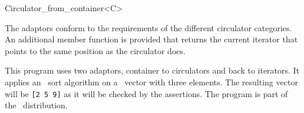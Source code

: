 \begin{ccClassTemplate}{Circulator_from_container<C>}

\ccOperations

The adaptors conform to the requirements of the different circulator
categories. An additional member function  is
provided that returns the current iterator that points to the same
position as the circulator does.

\ccExample

This program uses two adaptors, container to circulators and back to
iterators. It applies an \stl\ sort algorithm on a \stl\ vector with three
elements. The resulting vector will be {\tt [2 5 9]} as it will be
checked by the assertions. The program is part of the \cgal\ 
distribution.


\end{ccClassTemplate} 






